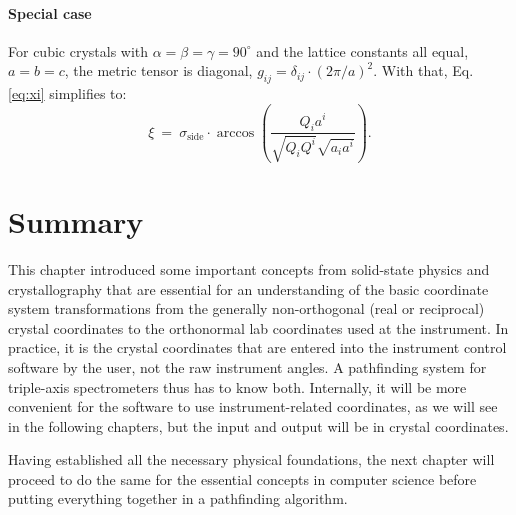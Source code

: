 \paragraph*{Special case}
For cubic crystals with $\alpha = \beta = \gamma = 90^{\circ}$ and the lattice constants all equal, 
$a = b = c$, the metric tensor is diagonal, $g_{ij} = \delta_{ij} \cdot \left( 2\pi / a \right)^2$.
With that, Eq. \ref{eq:xi} simplifies to:
\begin{equation}
	\xi \ =\  \sigma_{\mathrm{side}} \cdot \arccos \left( \frac{ Q_i a^i }{ \sqrt{Q_i Q^i} \sqrt{a_i a^i} } \right).
\end{equation}


\section{Summary}
This chapter introduced some important concepts from solid-state physics and crystallography that are essential
for an understanding of the basic coordinate system transformations from the generally non-orthogonal (real or 
reciprocal) crystal coordinates to the orthonormal lab coordinates used at the instrument.
In practice, it is the crystal coordinates that are entered into the instrument control software by
the user, not the raw instrument angles. A pathfinding system for triple-axis spectrometers thus has to know both.
Internally, it will be more convenient for the software to use instrument-related coordinates, as we will see in 
the following chapters, but the input and output will be in crystal coordinates.

Having established all the necessary physical foundations, the next chapter will proceed to do the same for the 
essential concepts in computer science before putting everything together in a pathfinding algorithm.
